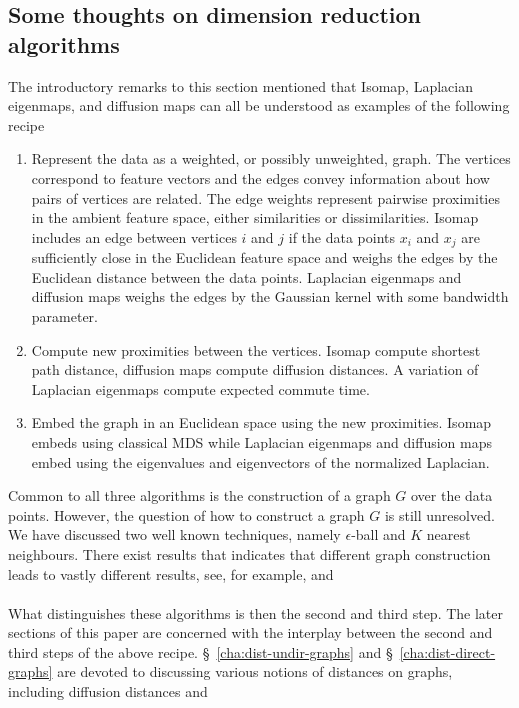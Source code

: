 \subsection{Some thoughts on dimension reduction algorithms}
\label{sec:some-thoughts-isomap}
The introductory remarks to this section mentioned that Isomap,
Laplacian eigenmaps, and diffusion maps can all be understood as
examples of the following recipe
\begin{enumerate}
\item Represent the data as a weighted, or possibly unweighted,
  graph. The vertices correspond to feature vectors and the edges
  convey information about how pairs of vertices are related. The edge
  weights represent pairwise proximities in the ambient feature space,
  either similarities or dissimilarities. Isomap includes an edge
  between vertices $i$ and $j$ if the data points $x_i$ and $x_j$ are
  sufficiently close in the Euclidean feature space and weighs the
  edges by the Euclidean distance between the data points. Laplacian
  eigenmaps and diffusion maps weighs the edges by the Gaussian
  kernel with some bandwidth parameter.
\item Compute new proximities between the vertices. Isomap compute
  shortest path distance, diffusion maps compute diffusion
  distances. A variation of Laplacian eigenmaps compute expected
  commute time.
\item Embed the graph in an Euclidean space using the new
  proximities. Isomap embeds using classical MDS while Laplacian
  eigenmaps and diffusion maps embed using the eigenvalues and
  eigenvectors of the normalized Laplacian. 
\end{enumerate}
Common to all three algorithms is the construction of a graph $G$ over
the data points. However, the question of how to construct a graph $G$
is still unresolved. We have discussed two well known techniques,
namely $\epsilon$-ball and $K$ nearest neighbours. There exist results
that indicates that different graph construction leads to vastly
different results, see, for example,
\citet{maier08:_influen} and \citet{hein07:_conver_laplac} \\ \\
%
%
\noindent
What distinguishes these algorithms is then the second and third
step. The later sections of this paper are concerned with the
interplay between the second and third steps of the above
recipe. \S~\ref{cha:dist-undir-graphs} and
\S~\ref{cha:dist-direct-graphs} are devoted to discussing various
notions of distances on graphs, including diffusion distances and
